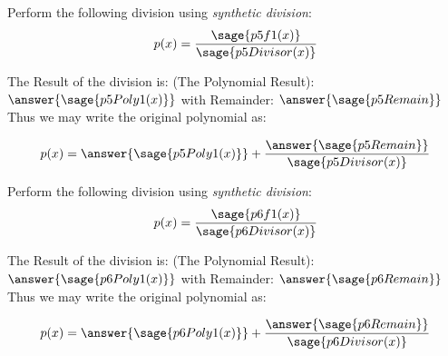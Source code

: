 \documentclass{ximera}
\begin{document}
\begin{problem}%
    Perform the following division using \textit{synthetic division}: 
    \[
        p(x) = \dfrac{\sage{p5f1(x)}}{\sage{p5Divisor(x)}}
    \]
    
    The Result of the division is: (The Polynomial Result): $\answer{\sage{p5Poly1(x)}}$ with Remainder: $\answer{\sage{p5Remain}}$ Thus we may write the original polynomial as:
    
    \[
        p(x) = \answer{\sage{p5Poly1(x)}} + \dfrac{\answer{\sage{p5Remain}}}{\sage{p5Divisor(x)}}
    \]
\end{problem}

\begin{problem}%
    Perform the following division using \textit{synthetic division}: 
    \[
        p(x) = \dfrac{\sage{p6f1(x)}}{\sage{p6Divisor(x)}}
    \]
    
    The Result of the division is: (The Polynomial Result): $\answer{\sage{p6Poly1(x)}}$ with Remainder: $\answer{\sage{p6Remain}}$ Thus we may write the original polynomial as:
    
    \[
        p(x) = \answer{\sage{p6Poly1(x)}} + \dfrac{\answer{\sage{p6Remain}}}{\sage{p6Divisor(x)}}
    \]
\end{problem}
\end{document}

